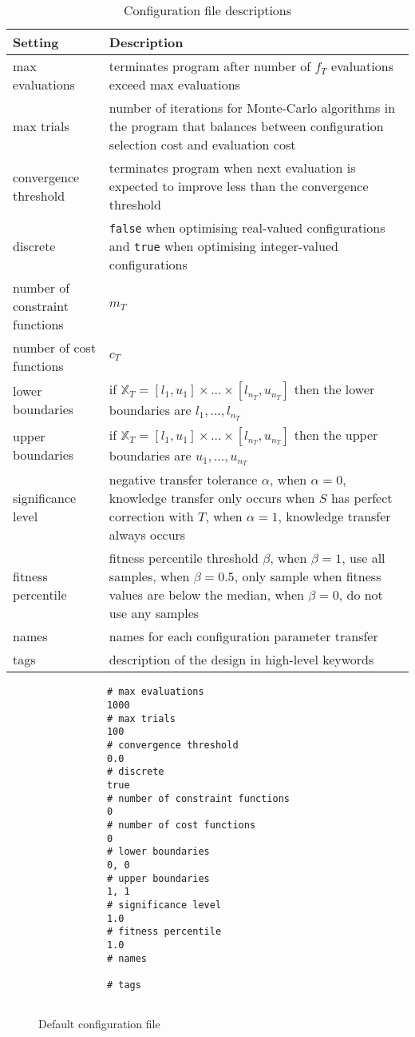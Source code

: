 \documentclass[10pt,a4paper]{article}
\begin{document}
\noindent
\begin{table}[H]
	\begin{tabularx}{\linewidth}{l X}
		\hline
		Setting & Description\\
		\hline
		max evaluations & terminates program after number of $f_T$ evaluations exceed max evaluations\\
		max trials & number of iterations for Monte-Carlo algorithms in the program that balances between configuration selection cost and evaluation cost\\
		convergence threshold & terminates program when next evaluation is expected to improve less than the convergence threshold\\
		discrete & \verb|false| when optimising real-valued configurations and \verb|true| when optimising integer-valued configurations\\
		number of constraint functions & $m_T$\\
		number of cost functions & $c_T$\\
		lower boundaries & if $\mathbb{X}_T=[l_1,u_1]\times...\times[l_{n_T},u_{n_T}]$ then the lower boundaries are $l_1,...,l_{n_T}$\\
		upper boundaries & if $\mathbb{X}_T=[l_1,u_1]\times...\times[l_{n_T},u_{n_T}]$ then the upper boundaries are $u_1,...,u_{n_T}$\\
		significance level & negative transfer tolerance $\alpha$, when $\alpha=0$, knowledge transfer only occurs when $S$ has perfect correction with $T$, when $\alpha=1$, knowledge transfer always occurs\\
		fitness percentile & fitness percentile threshold $\beta$, when $\beta=1$, use all samples, when $\beta=0.5$, only sample when fitness values are below the median, when $\beta=0$, do not use any samples\\
		names & names for each configuration parameter transfer\\
		tags & description of the design in high-level keywords\\
		\hline
	\end{tabularx}
	\caption{Configuration file descriptions}
\end{table}

\begin{figure}[H]
	\begin{framed}
		\begin{verbatim}
			# max evaluations
			1000
			# max trials
			100
			# convergence threshold
			0.0
			# discrete
			true
			# number of constraint functions
			0
			# number of cost functions
			0
			# lower boundaries
			0, 0
			# upper boundaries
			1, 1
			# significance level
			1.0
			# fitness percentile
			1.0
			# names
			
			# tags
			
		\end{verbatim}
	\end{framed}
	\caption{Default configuration file}
\end{figure}
\end{document}
